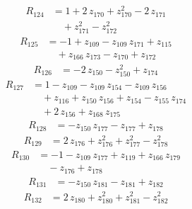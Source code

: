 \begin{equation*}\begin{aligned}
R_{124}&=1 +2\,z_{170} +z_{170}^{2} -2\,z_{171} \\
&\quad +z_{171}^{2} -z_{172}^{2}
\end{aligned}\end{equation*}
\begin{equation*}\begin{aligned}
R_{125}&=-1 +z_{109} -z_{109}\,z_{171} +z_{115} \\
&\quad +z_{166}\,z_{173} -z_{170} +z_{172}
\end{aligned}\end{equation*}
\begin{equation*}\begin{aligned}
R_{126}&=-2\,z_{150} -z_{150}^{2} +z_{174}
\end{aligned}\end{equation*}
\begin{equation*}\begin{aligned}
R_{127}&=1 -z_{109} -z_{109}\,z_{154} -z_{109}\,z_{156} \\
&\quad +z_{116} +z_{150}\,z_{156} +z_{154} -z_{155}\,z_{174} \\
&\quad +2\,z_{156} +z_{168}\,z_{175}
\end{aligned}\end{equation*}
\begin{equation*}\begin{aligned}
R_{128}&=-z_{150}\,z_{177} -z_{177} +z_{178}
\end{aligned}\end{equation*}
\begin{equation*}\begin{aligned}
R_{129}&=2\,z_{176} +z_{176}^{2} +z_{177}^{2} -z_{178}^{2}
\end{aligned}\end{equation*}
\begin{equation*}\begin{aligned}
R_{130}&=-1 -z_{109}\,z_{177} +z_{119} +z_{166}\,z_{179} \\
&\quad -z_{176} +z_{178}
\end{aligned}\end{equation*}
\begin{equation*}\begin{aligned}
R_{131}&=-z_{150}\,z_{181} -z_{181} +z_{182}
\end{aligned}\end{equation*}
\begin{equation*}\begin{aligned}
R_{132}&=2\,z_{180} +z_{180}^{2} +z_{181}^{2} -z_{182}^{2}
\end{aligned}\end{equation*}
